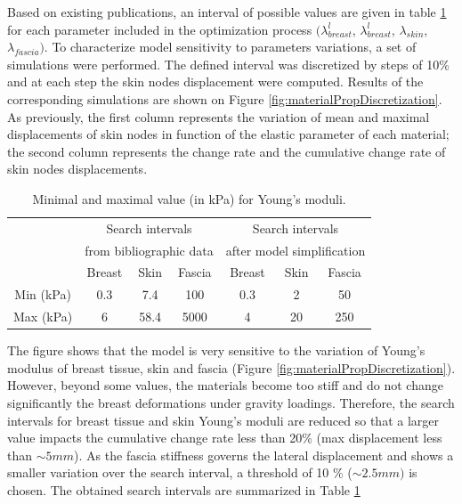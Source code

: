  Based on existing publications, an interval of possible values are given in table \ref{table:minandmaxelasticmodulus} for each parameter included in the optimization process $(\lambda_{breast}^l$, $\lambda_{breast}^l$, $\lambda_{skin}$, $\lambda_{fascia})$. To characterize model sensitivity to parameters variations, a set of simulations were performed. The defined interval was discretized by steps of 10\% and at each step the skin nodes displacement were computed. Results of the corresponding simulations are shown on Figure  \ref{fig:materialPropDiscretization}. As previously, the first column represents the variation of mean and maximal displacements of skin nodes in function of the elastic parameter of each material; the second column represents the change rate and the cumulative change rate of skin nodes displacements.


\begin{table}[!h]
\centering
\begin{tabular}{|c||c|c|c||c|c|c|}
\hline
&\multicolumn{3}{|c||}{Search intervals}& \multicolumn{3}{c|}{Search intervals}\\
&\multicolumn{3}{|c||}{ from bibliographic data}& \multicolumn{3}{c|}{ after model simplification}\\
\hline
\hline
& Breast & Skin & Fascia & Breast & Skin & Fascia \\
\hline
Min (kPa)  & 0.3 & 7.4 & 100 & 0.3 & 2 & 50\\
\hline
Max (kPa) & 6 & 58.4 & 5000& 4& 20 &250 \\
\hline
\end{tabular}
\caption{Minimal and maximal value (in kPa) for Young's moduli.}
\label{table:minandmaxelasticmodulus}
\end{table}

The figure shows that the model is very sensitive to the variation of Young’s modulus of breast tissue, skin and fascia (Figure \ref{fig:materialPropDiscretization}). However, beyond some values, the materials become too stiff and do not change significantly the breast deformations under gravity loadings.  Therefore, the search intervals for breast tissue and skin Young's moduli are reduced so that a larger value impacts the cumulative change rate less than 20\% (max displacement less than $\sim 5mm$). As the fascia stiffness governs the lateral displacement and shows a smaller variation over the search interval, a threshold of 10 \% ($\sim 2.5mm)$ is chosen. The obtained search intervals are summarized in Table \ref{table:minandmaxelasticmodulus} 

